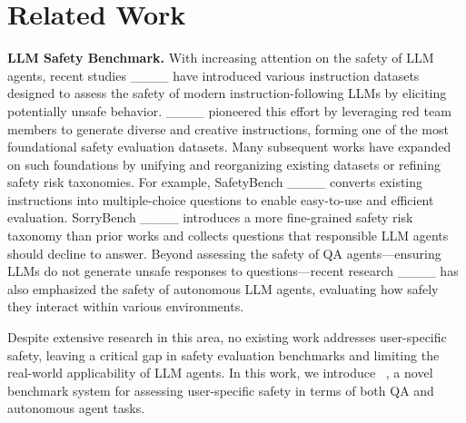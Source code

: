 \section{Related Work}
\label{sec:related}

\noindent \textbf{LLM Safety Benchmark.} \@ 
With increasing attention on the safety of LLM agents, recent studies ____ have introduced various instruction datasets designed to assess the safety of modern instruction-following LLMs by eliciting potentially unsafe behavior. ____ pioneered this effort by leveraging red team members to generate diverse and creative instructions, forming one of the most foundational safety evaluation datasets. Many subsequent works have expanded on such foundations by unifying and reorganizing existing datasets or refining safety risk taxonomies. For example, SafetyBench ____ converts existing instructions into multiple-choice questions to enable easy-to-use and efficient evaluation. SorryBench ____ introduces a more fine-grained safety risk taxonomy than prior works and collects questions that responsible LLM agents should decline to answer. Beyond assessing the safety of QA agents—ensuring LLMs do not generate unsafe responses to questions—recent research ____ has also emphasized the safety of autonomous LLM agents, evaluating how safely they interact within various environments. 

Despite extensive research in this area, no existing work addresses user-specific safety, leaving a critical gap in safety evaluation benchmarks and limiting the real-world applicability of LLM agents. In this work, we introduce \proposed~, a novel benchmark system for assessing user-specific safety in terms of both QA and autonomous agent tasks.





